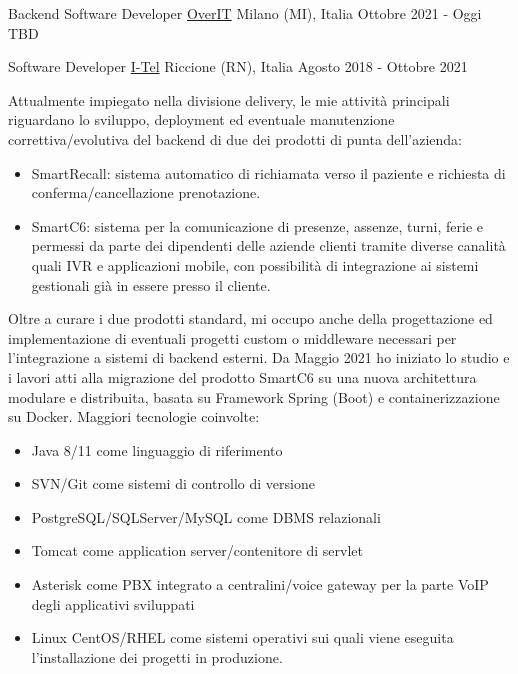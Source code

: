 

\begin{cventries}

\cventry
	{Backend Software Developer} %
	{\href{https://overit.it/}{OverIT}} %
	{Milano (MI), Italia} %
	{Ottobre 2021 - Oggi} %
	{
		TBD
	}


\cventry
    {Software Developer} %
    {\href{https://i-tel.it}{I-Tel}} %
    {Riccione (RN), Italia} %
    {Agosto 2018 - Ottobre 2021} %
    {
      	Attualmente impiegato nella divisione delivery, le mie attività principali riguardano lo sviluppo, deployment ed eventuale manutenzione correttiva/evolutiva del backend di due dei prodotti di punta dell'azienda:
      	\begin{itemize}
      		\item {SmartRecall: sistema automatico di richiamata verso il paziente e richiesta di conferma/cancellazione prenotazione.}
      		\item {SmartC6: sistema per la comunicazione di presenze, assenze, turni, ferie e permessi da parte dei dipendenti delle aziende clienti tramite diverse canalità quali IVR e applicazioni mobile, con possibilità di integrazione ai sistemi gestionali già in essere presso il cliente.}
      	\end{itemize}
      	Oltre a curare i due prodotti standard, mi occupo anche della progettazione ed implementazione di eventuali progetti custom o middleware necessari per l'integrazione a sistemi di backend esterni.
      	Da Maggio 2021 ho iniziato lo studio e i lavori atti alla migrazione del prodotto SmartC6 su una nuova architettura modulare e distribuita, basata su Framework Spring (Boot) e containerizzazione su Docker.
      	Maggiori tecnologie coinvolte:
      	\begin{itemize}
      		\item {Java 8/11 come linguaggio di riferimento}
      		\item {SVN/Git come sistemi di controllo di versione}
      		\item {PostgreSQL/SQLServer/MySQL come DBMS relazionali}
      		\item {Tomcat come application server/contenitore di servlet}
      		\item {Asterisk come PBX integrato a centralini/voice gateway per la parte VoIP degli applicativi sviluppati}
      		\item {Linux CentOS/RHEL come sistemi operativi sui quali viene eseguita l'installazione dei progetti in produzione.}
      	\end{itemize}
    }



\end{cventries}
